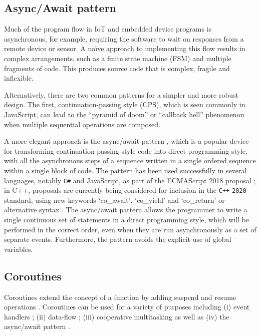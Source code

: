 \subsection{Async/Await pattern}

Much of the program flow in IoT and embedded device programs is asynchronous, for example, requiring the software to wait on responses from a remote device or sensor. A naïve approach to implementing this flow results in complex arrangements, such as a finite state machine (FSM) and multiple fragments of code. This produces source code that is complex, fragile and inflexible.

Alternatively, there are two common patterns for a simpler and more robust design. The first, continuation-passing style (CPS), which is seen commonly in JavaScript, can lead to the “pyramid of doom” or “callback hell” phenomenon \cite{Brodu2015, Edwards2009, Madsen2017, Kambona2013} when multiple sequential operations are composed.

A more elegant approach is the async/await pattern \cite{Bierman2012, Haller2016, Okur2014, Syme2011}, which is a popular device for transforming continuation-passing style code into direct programming style, with all the asynchronous steps of a sequence written in a single ordered sequence within a single block of code. The pattern has been used successfully in several languages, notably \verb!C#! \cite{Bierman2012, Okur2014} and JavaScript, as part of the ECMAScript 2018 proposal \cite{ECMA2017}; in C++, proposals are currently being considered for inclusion in the \verb!C++! \verb!2020! standard, using new keywords ‘co\_await’, ‘co\_yield’ and ‘co\_return’ or alternative syntax \cite{ISO2017, Romer2018}. The async/await pattern allows the programmer to write a single continuous set of statements in a direct programming style, which will be performed in the correct order, even when they are run asynchronously as a set of separate events. Furthermore, the pattern avoids the explicit use of global variables.

\subsection{Coroutines}

Coroutines extend the concept of a function by adding suspend and resume operations \cite{Conway1963, Knuth1968, Marlin1979}. Coroutines can be used for a variety of purposes including (i) event handlers \cite{Dunkels2006}; (ii) data-flow \cite{Kugler2013}; (iii) cooperative multitasking \cite{Susilo2009} as well as (iv) the async/await pattern \cite{ISO2017}.

